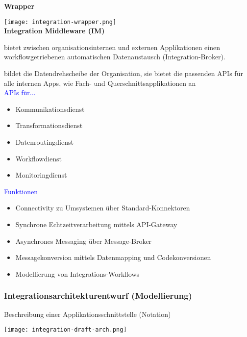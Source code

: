 \textbf{Wrapper}

\texttt{[image: integration-wrapper.png]} \\

\textbf{Integration Middleware (IM)}

bietet zwischen organisationsinternen und externen Applikationen einen workflowgetriebenen automatischen Datenaustausch (Integration-Broker).

bildet die Datendrehscheibe der Organisation, sie bietet die passenden APIs für alle internen Apps, wie Fach- und Querschnittsapplikationen an \\

\textcolor{blue}{APIs für...}

\begin{itemize}
    \item Kommunikationsdienst
    \item Transformationsdienst
    \item Datenroutingdienst
    \item Workflowdienst
    \item Monitoringdienst
\end{itemize}
\vspace{10pt}
\textcolor{blue}{Funktionen}

\begin{itemize}
    \item Connectivity zu Umsystemen über Standard-Konnektoren
    \item Synchrone Echtzeitverarbeitung mittels API-Gateway
    \item Asynchrones Messaging über Message-Broker
    \item Messagekonversion mittels Datenmapping und Codekonversionen
    \item Modellierung von Integrations-Workflows
\end{itemize}

\subsubsection{Integrationsarchitekturentwurf (Modellierung)}

Beschreibung einer Applikationsschnittstelle (Notation)

\texttt{[image: integration-draft-arch.png]}

